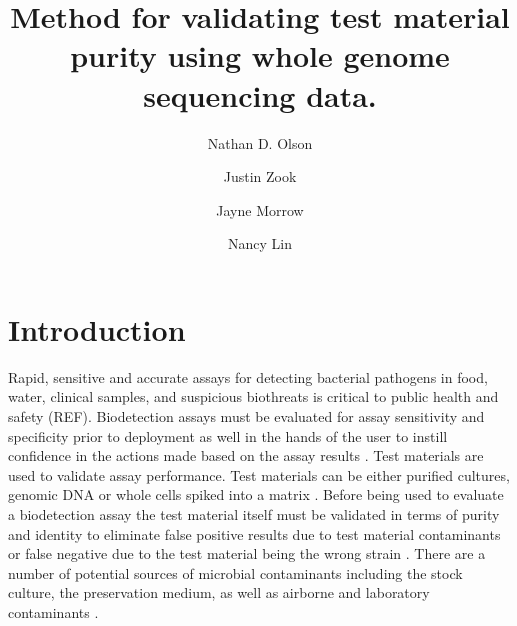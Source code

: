 \documentclass[fleqn,10pt,lineno]{wlpeerj}\usepackage[]{graphicx}\usepackage[]{color}
\title{Method for validating test material purity using whole genome sequencing data.}
\author[1]{Nathan D. Olson}
\author[1]{Justin Zook}
\author[1]{Jayne Morrow}
\author[1]{Nancy Lin}
\affil[1]{Biosystems and Biomaterials Division, National Institute of Standards and Technology}
\begin{document}
\flushbottom
\maketitle
\thispagestyle{empty}

\section*{Introduction}
Rapid, sensitive and accurate assays for detecting bacterial pathogens in food, water, clinical samples, and  suspicious biothreats is critical to public health and safety (REF).  Biodetection assays must be evaluated for assay sensitivity and specificity prior to deployment as well in the hands of the user to instill confidence in the actions made based on the assay results \citep{Ieven2013,International2011,EPA2004,ISO/TS2010,Guide1998,Feldsine2002}.  Test materials are used to validate assay performance.  Test materials can be either purified cultures, genomic DNA or whole cells spiked into a matrix \citep{EPA2004,ISO/TS2010,CLSI2010}.  Before being used to evaluate a biodetection assay the test material itself must be validated in terms of purity and identity to eliminate false positive results due to test material contaminants or false negative due to the test material being the wrong strain \citep{CLSI2010}.  There are a number of potential sources of microbial contaminants  including the stock culture, the preservation medium, as well as airborne and laboratory contaminants \citep{Marron2013,Shrestha2013,Tanner1998}.   
 
\end{document}
